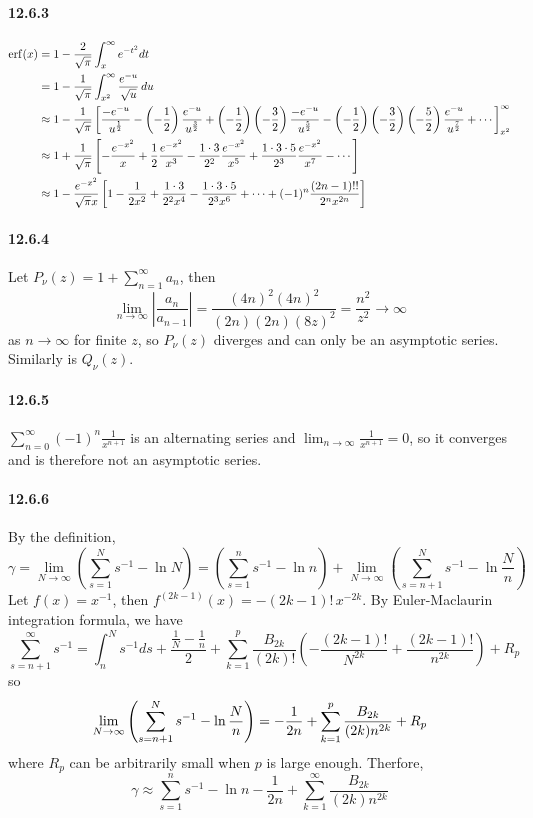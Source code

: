 \documentclass[a4paper]{article}
\begin{document}
\paragraph{12.6.3}
\begin{equation*}
    \begin{split}
        \mathrm{erf}(x) & =1-\frac{2}{\sqrt{\pi}}\int_x^\infty e^{-t^2}dt\\
        & =1-\frac{1}{\sqrt{\pi}}\int_{x^2}^\infty\frac{e^{-u}}{\sqrt{u}}\,du\\
        & \approx 1-\frac{1}{\sqrt{\pi}}\left[\frac{-e^{-u}}{u^{\frac{1}{2}}}-\left(-\frac{1}{2}\right)\frac{e^{-u}}{u^{\frac{3}{2}}}+\left(-\frac{1}{2}\right)\left(-\frac{3}{2}\right)\frac{-e^{-u}}{u^{\frac{5}{2}}}-\left(-\frac{1}{2}\right)\left(-\frac{3}{2}\right)\left(-\frac{5}{2}\right)\frac{e^{-u}}{u^{\frac{7}{2}}}+\cdots \right]_{x^2}^\infty\\
        & \approx 1+\frac{1}{\sqrt{\pi}}\left[-\frac{e^{-x^2}}{x}+\frac{1}{2}\frac{e^{-x^2}}{x^3}-\frac{1\cdot3}{2^2}\frac{e^{-x^2}}{x^5}+\frac{1\cdot3\cdot5}{2^3}\frac{e^{-x^2}}{x^7}-\cdots \right]\\
        & \approx 1-\frac{e^{-x^2}}{\sqrt{\pi}x}\left[1-\frac{1}{2x^2}+\frac{1\cdot3}{2^2x^4}-\frac{1\cdot3\cdot5}{2^3x^6}+\cdots+(-1)^n\frac{(2n-1)!!}{2^nx^{2n}} \right]
    \end{split}
\end{equation*}
 
\paragraph{12.6.4}
Let $P_\nu(z)=1+\sum_{n=1}^\infty a_n$, then
\[
\lim_{n\to\infty}\left|\frac{a_n}{a_{n-1}} \right|=\frac{(4n)^2(4n)^2}{(2n)(2n)(8z)^2}=\frac{n^2}{z^2}\to\infty
\]
as $n\to\infty$ for finite $z$, so $P_\nu(z)$ diverges and can only be an asymptotic series. Similarly is $Q_\nu(z)$.

\paragraph{12.6.5}
$\sum_{n=0}^\infty(-1)^n\frac{1}{x^{n+1}}$ is an alternating series and $\lim_{n\to\infty}\frac{1}{x^{n+1}}=0$, so it converges and is therefore not an asymptotic series.

\paragraph{12.6.6}
By the definition,
\[
\gamma=\lim_{N\to\infty}\left(\sum_{s=1}^Ns^{-1}-\ln N \right)=\left(\sum_{s=1}^ns^{-1}-\ln n \right)+\lim_{N\to\infty}\left(\sum_{s=n+1}^N s^{-1}-\ln\frac{N}{n} \right)
\]
Let $f(x)=x^{-1}$, then $f^{(2k-1)}(x)=-(2k-1)!\,x^{-2k}$. By Euler-Maclaurin integration formula, we have
\[
\sum_{s=n+1}^\infty s^{-1}=\int_n^Ns^{-1}ds+\frac{\frac{1}{N}-\frac{1}{n}}{2}+\sum_{k=1}^p\frac{B_{2k}}{(2k)!}\left(-\frac{(2k-1)!}{N^{2k}}+\frac{(2k-1)!}{n^{2k}} \right)+R_p
\]
so
\[
\lim_{N\to\infty}\left(\sum_{s=n+1}^Ns^{-1}-\ln\frac{N}{n} \right)=-\frac{1}{2n}+\sum_{k=1}^p\frac{B_{2k}}{(2k)n^{2k}}+R_p
\]
where $R_p$ can be arbitrarily small when $p$ is large enough. Therfore,
\[
\gamma\approx\sum_{s=1}^ns^{-1}-\ln n-\frac{1}{2n}+\sum_{k=1}^\infty\frac{B_{2k}}{(2k)n^{2k}}
\]
\end{document}
